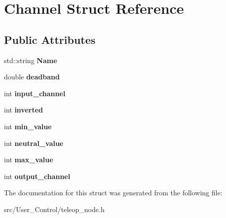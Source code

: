\hypertarget{structChannel}{}\section{Channel Struct Reference}
\label{structChannel}
\subsection*{Public Attributes}
\begin{DoxyCompactItemize}
\item 
\mbox{\label{structChannel_a0693b7f0e2deb34fe585303a746e46c5}} 
std\+::string {\bfseries Name}
\item 
\mbox{\label{structChannel_ac3ea766add18d675c59842857565ebd4}} 
double {\bfseries deadband}
\item 
\mbox{\label{structChannel_ae90d0a48e1762f53897a0c8591a12cc6}} 
int {\bfseries input\+\_\+channel}
\item 
\mbox{\label{structChannel_a08733e6482bd9910aa81d7e805d5e3a8}} 
int {\bfseries inverted}
\item 
\mbox{\label{structChannel_abcebd5cc6548269ccef4fbf0dbe91597}} 
int {\bfseries min\+\_\+value}
\item 
\mbox{\label{structChannel_a68cd3e704957c593fe7238c4db95c750}} 
int {\bfseries neutral\+\_\+value}
\item 
\mbox{\label{structChannel_aed4e87f0ea7dbbf7bb45c4a8856ea8fa}} 
int {\bfseries max\+\_\+value}
\item 
\mbox{\label{structChannel_a51a23fa9b17ea74c0c45b153784e64d4}} 
int {\bfseries output\+\_\+channel}
\end{DoxyCompactItemize}


The documentation for this struct was generated from the following file\+:\begin{DoxyCompactItemize}
\item 
src/\+User\+\_\+\+Control/teleop\+\_\+node.\+h\end{DoxyCompactItemize}
